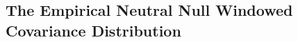 \documentclass[11pt]{article}
\DeclareMathOperator{\var}{Var}
\DeclareMathOperator{\cov}{Cov}
\begin{document}



\subsection{The Empirical Neutral Null Windowed Covariance Distribution}
\label{supp:empirical-null}
\end{document}
